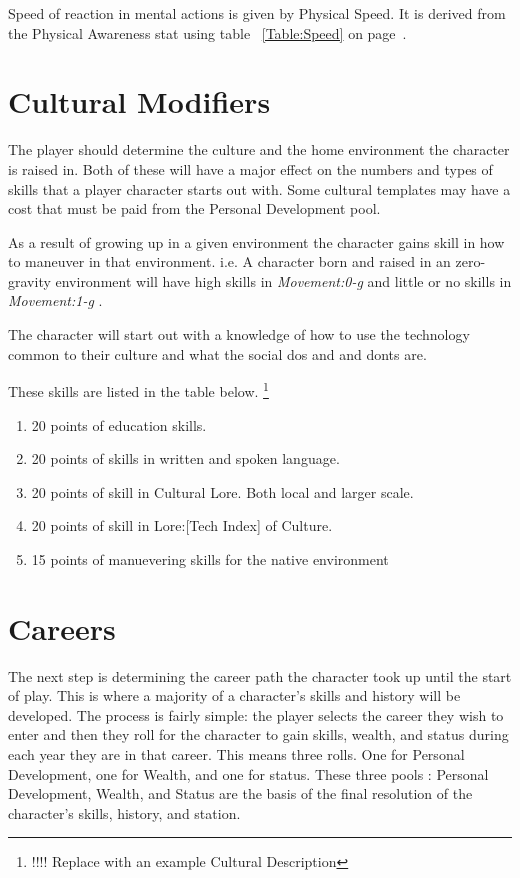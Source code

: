Speed of reaction in mental actions is given by 
Physical Speed. It is derived from the
Physical Awareness stat using table ~\ref{Table:Speed} on page~\pageref{Table:Speed}.



\section{Cultural Modifiers}

The player should determine the culture and the home environment
the character is raised in. Both of these will have a major 
effect on the numbers and types of skills that a player character
starts out with. Some cultural templates may have a cost that must be 
paid from the Personal Development pool.

As a result of growing up in a given environment the character 
gains skill in how to maneuver in that environment. i.e. A character
born and raised in an zero-gravity environment will have high skills
in {\em Movement:0-g } and little or no skills in {\em Movement:1-g }.

The character will start out with a knowledge of how to
use the technology common to their culture and what the social dos and
and donts are.

These skills are listed in the table below.
\footnote{!!!! Replace with an example Cultural Description }
\begin{enumerate}
	\item 20 points of education skills.
	\item 20 points of skills in written and spoken language.
	\item 20 points of skill in Cultural Lore. Both local and larger scale.
	\item 20 points of skill in Lore:[Tech Index] of Culture.
	\item 15 points of manuevering skills for the native environment
\end{enumerate}

\section{Careers}

The next step is determining the career path the character
took up until the start of play. This is where a majority of a character's
skills and history will be developed. The process is fairly simple:
the player selects the career they wish to enter and then they roll 
for the character to gain skills, wealth, and status during each 
year they are in that career. This means three rolls. One for
Personal Development, one for Wealth, and one for status.
These three pools : Personal Development, Wealth, and Status
are the basis of the final resolution of
the character's skills, history, and station.

